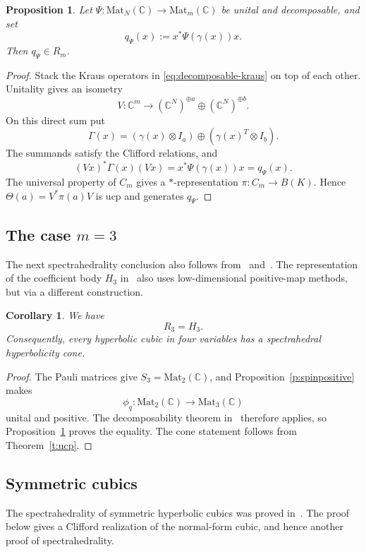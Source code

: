 \documentclass[11pt,onecolumn]{article}
\theoremstyle{blueplain}
\newtheorem{proposition}[proposition]{Proposition}
\newtheorem{corollary}[corollary]{Corollary}
\theoremstyle{bluedefinition}
\theoremstyle{bluedefinition}
\newcommand{\C}{\mathbb C}
\newcommand{\M}{\mathrm{Mat}}
\begin{document}
\begin{proposition}\label{p:decomposable}
Let $\Psi\colon \M_N(\C)\to \M_m(\C)$ be unital and decomposable, and set
\[
q_\Psi(x):=x^*\Psi(\gamma(x))x.
\]
Then $q_\Psi\in R_m$.
\end{proposition}

\begin{proof}
Stack the Kraus operators in \eqref{eq:decomposable-kraus} on top of each other. Unitality gives
an isometry
\[
V\colon \C^m\to(\C^N)^{\oplus a}\oplus(\C^N)^{\oplus b}.
\]
On this direct sum put
\[
\Gamma(x)
=(\gamma(x)\otimes I_a)\oplus(\gamma(x)^T\otimes I_b).
\]
The summands satisfy the Clifford relations, and
\[
(Vx)^*\Gamma(x)(Vx)
=x^*\Psi(\gamma(x))x
=q_\Psi(x).
\]
The universal property of $C_m$ gives a $*$-representation
$\pi\colon C_m\to B(K)$. Hence $\Theta(a)=V^*\pi(a)V$ is ucp and generates
$q_\Psi$.
\end{proof}

\subsection{The case \texorpdfstring{$m=3$}{m=3}}

The next spectrahedrality conclusion also follows from~\cite{BuckleyKosir} and~\cite{Saunderson}.
The representation of the coefficient body $H_3$ in~\cite{Hildebrand}
also uses low-dimensional positive-map methods, but via a different
construction. 

\begin{corollary}\label{c:lowdim}
We have
\[
R_3=H_3.
\]
Consequently, every hyperbolic cubic in four variables has a
spectrahedral hyperbolicity cone.
\end{corollary}

\begin{proof}
The Pauli matrices give $S_3=\M_2(\C)$, and
Proposition~\ref{p:spinpositive} makes
\[
\phi_q\colon \M_2(\C)\to \M_3(\C)
\]
unital and positive. The decomposability theorem in~\cite{Woronowicz}
therefore applies, so Proposition~\ref{p:decomposable} proves the equality.
The cone statement follows from Theorem~\ref{t:ucp}.
\end{proof}

\subsection{Symmetric cubics}

The spectrahedrality of symmetric hyperbolic cubics was proved
in~\cite{BlekhermanLindbergShu}.
The proof below gives a Clifford realization of the normal-form cubic, and hence another proof of spectrahedrality.
\end{document}
